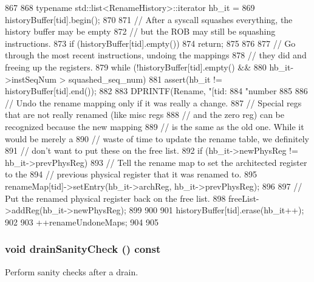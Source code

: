 \begin{DoxyCode}
867 {
868     typename std::list<RenameHistory>::iterator hb_it =
869         historyBuffer[tid].begin();
870 
871     // After a syscall squashes everything, the history buffer may be empty
872     // but the ROB may still be squashing instructions.
873     if (historyBuffer[tid].empty()) {
874         return;
875     }
876 
877     // Go through the most recent instructions, undoing the mappings
878     // they did and freeing up the registers.
879     while (!historyBuffer[tid].empty() &&
880            hb_it->instSeqNum > squashed_seq_num) {
881         assert(hb_it != historyBuffer[tid].end());
882 
883         DPRINTF(Rename, "[tid:%
884                 "number %
885 
886         // Undo the rename mapping only if it was really a change.
887         // Special regs that are not really renamed (like misc regs
888         // and the zero reg) can be recognized because the new mapping
889         // is the same as the old one.  While it would be merely a
890         // waste of time to update the rename table, we definitely
891         // don't want to put these on the free list.
892         if (hb_it->newPhysReg != hb_it->prevPhysReg) {
893             // Tell the rename map to set the architected register to the
894             // previous physical register that it was renamed to.
895             renameMap[tid]->setEntry(hb_it->archReg, hb_it->prevPhysReg);
896 
897             // Put the renamed physical register back on the free list.
898             freeList->addReg(hb_it->newPhysReg);
899         }
900 
901         historyBuffer[tid].erase(hb_it++);
902 
903         ++renameUndoneMaps;
904     }
905 }
\end{DoxyCode}
\hypertarget{classDefaultRename_a0240eb42fa57fe5d3788093f62b77347}{
\subsubsection[{drainSanityCheck}]{\setlength{\rightskip}{0pt plus 5cm}void drainSanityCheck () const}}
\label{classDefaultRename_a0240eb42fa57fe5d3788093f62b77347}
Perform sanity checks after a drain. 


